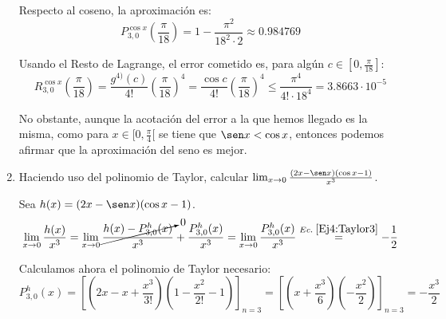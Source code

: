 \documentclass[12pt]{article}
\begin{document}
\begin{ejercicio}
\begin{enumerate}
        Respecto al coseno, la aproximación es:
        \begin{equation*}
            P_{3,0}^{\cos x} \left(\frac{\pi}{18}\right) = 1 -\frac{\pi^2}{18^2\cdot 2} \approx 0.984769
        \end{equation*}
        
        Usando el Resto de Lagrange, el error cometido es, para algún $c\in \left[0, \frac{\pi}{18}\right]$:
        \begin{equation*}
            R_{3,0}^{\cos x} \left(\frac{\pi}{18}\right) = \frac{g^{4)}(c)}{4!} \left(\frac{\pi}{18}\right)^4 = \frac{\cos c}{4!}  \left(\frac{\pi}{18}\right)^4 \leq \frac{\pi^4}{4! \cdot 18^4} = 3.8663\cdot 10^{-5}
        \end{equation*}

        No obstante, aunque la acotación del error a la que hemos llegado es la misma, como para $x\in [0,\frac{\pi}{4}[$ se tiene que $\sen x < \cos x$, entonces podemos afirmar que la aproximación del seno es mejor.

        \item Haciendo uso del polinomio de Taylor, calcular $\lim_{x\to 0} \frac{(2x-\sen x)(\cos x -1)}{x^3}$.

        Sea $h(x)=(2x-\sen x)(\cos x -1)$.
        \begin{equation*}
            \lim_{x\to 0} \frac{h(x)}{x^3}
            = \lim_{x\to 0} \cancelto{0}{\frac{h(x)-P_{3,0}^h(x)}{x^3}} +\frac{P_{3,0}^h(x)}{x^3} = \lim_{x\to 0} \frac{P_{3,0}^h(x)}{x^3}
            \stackrel{Ec.\;\ref{Ej4:Taylor3}}{=} -\frac{1}{2}
        \end{equation*}

        Calculamos ahora el polinomio de Taylor necesario:
        \begin{equation} \label{Ej4:Taylor3}
            P_{3,0}^h(x) = \left[\left(2x-x+\frac{x^3}{3!}\right) \left(1-\frac{x^2}{2!} -1\right)\right]_{n=3}
            = \left[\left(x+\frac{x^3}{6}\right) \left(-\frac{x^2}{2}\right)\right]_{n=3} = -\frac{x^3}{2}
        \end{equation}
    \end{enumerate}
\end{ejercicio}
\end{document}
